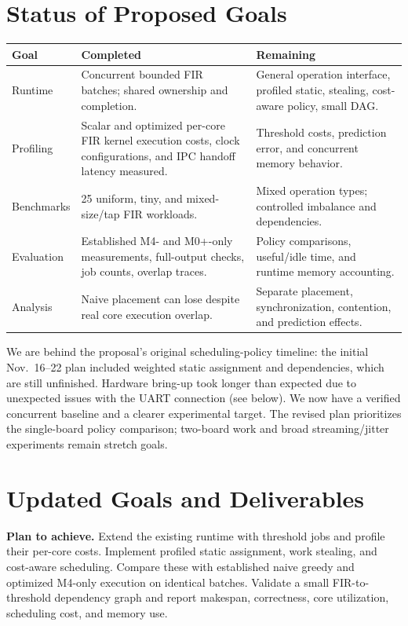 \documentclass[10pt]{article}
\begin{document}
\section{Status of Proposed Goals}
\begin{center}
\normalsize
\begin{tabularx}{\linewidth}{@{}p{2.1cm}YY@{}}
\toprule
\textbf{Goal} & \textbf{Completed} & \textbf{Remaining} \\
\midrule
Runtime & Concurrent bounded FIR batches; shared ownership and completion. & General operation interface, profiled static, stealing, cost-aware policy, small DAG. \\
Profiling & Scalar and optimized per-core FIR kernel execution costs, clock configurations, and IPC handoff latency measured. & Threshold costs, prediction error, and concurrent memory behavior. \\
Benchmarks & 25 uniform, tiny, and mixed-size/tap FIR workloads. & Mixed operation types; controlled imbalance and dependencies. \\
Evaluation & Established M4- and M0+-only measurements, full-output checks, job counts, overlap traces. & Policy comparisons, useful/idle time, and runtime memory accounting. \\
Analysis & Naive placement can lose despite real core execution overlap. & Separate placement, synchronization, contention, and prediction effects. \\
\bottomrule
\end{tabularx}
\end{center}
We are behind the proposal's original scheduling-policy timeline: the initial
Nov.\ 16--22 plan included weighted static assignment and dependencies, which
are still unfinished. Hardware bring-up took longer than expected due to unexpected issues with the UART connection (see below). We now
have a verified concurrent baseline and a clearer experimental target. The
revised plan prioritizes the single-board policy comparison; two-board work
and broad streaming/jitter experiments remain stretch goals.

\newpage
\section{Updated Goals and Deliverables}
\textbf{Plan to achieve.} Extend the existing runtime with threshold jobs and profile their per-core costs. Implement profiled static assignment, work stealing, and cost-aware scheduling. Compare these with established naive greedy and optimized M4-only execution on identical
batches. Validate a small FIR-to-threshold dependency graph and report
makespan, correctness, core utilization, scheduling cost, and memory use.
\end{document}
